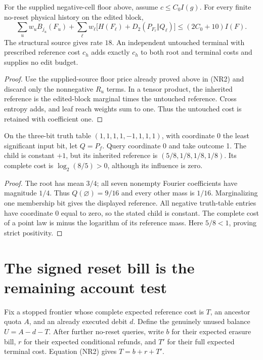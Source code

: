 \begin{proposition}
For the supplied negative-cell floor above, assume $c\le C_0 I(g)$.
For every finite no-reset physical history on the edited block,
\[
 \sum_u w_uB_{j_u}(F_u)+
 \sum_\ell w_\ell\bigl[H(F_\ell)+D_2(P_{F_\ell}\Vert Q_\ell)\bigr]
 \le (2C_0+10)I(F).
 \tag{NR3}
\]
The structural source gives rate $18$. An independent untouched
terminal with prescribed reference cost $c_h$ adds exactly $c_h$
to both root and terminal costs and supplies no edit budget.
\end{proposition}
\begin{proof}
Use the supplied-source floor price already proved above in (NR2)
and discard only the nonnegative $R_u$ terms. In a tensor product,
the inherited reference is the edited-block marginal times the
untouched reference. Cross entropy adds, and leaf reach weights
sum to one. Thus the untouched cost is retained with coefficient one.
\end{proof}

\begin{proposition}
On the three-bit truth table $(1,1,1,1,-1,1,1,1)$, with coordinate
0 the least significant input bit, let $Q=P_f$. Query coordinate 0
and take outcome 1. The child is constant $+1$, but its inherited
reference is $(5/8,1/8,1/8,1/8)$. Its complete cost is
$\log_2(8/5)>0$, although its influence is zero.
\end{proposition}
\begin{proof}
The root has mean $3/4$; all seven nonempty Fourier coefficients
have magnitude $1/4$. Thus $Q(\varnothing)=9/16$ and every
other mass is $1/16$. Marginalizing one membership bit gives
the displayed reference. All negative truth-table entries have
coordinate 0 equal to zero, so the stated child is constant.
The complete cost of a point law is minus the logarithm of its
reference mass. Here $5/8<1$, proving strict positivity.
\end{proof}

\section{The signed reset bill is the remaining account test}
\label{sec:resetbill}
Fix a stopped frontier whose complete expected reference cost is
$T$, an ancestor quota $A$, and an already executed debit $d$.
Define the genuinely unused balance $U=A-d-T$.
After further no-reset queries, write $b$ for their expected erasure
bill, $r$ for their expected conditional refunds, and $T'$ for
their full expected terminal cost. Equation (NR2) gives
$T=b+r+T'$.

